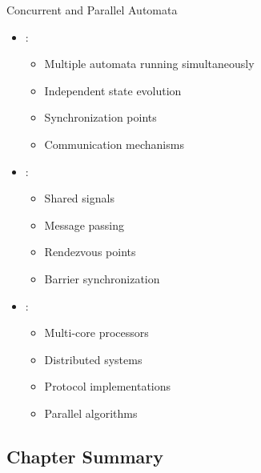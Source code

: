 \begin{frame}{Concurrent and Parallel Automata}
\begin{itemize}
\item {}:
\begin{itemize}
\item Multiple automata running simultaneously
\item Independent state evolution
\item Synchronization points
\item Communication mechanisms
\end{itemize}
\vspace{0.5cm}
\item {}:
\begin{itemize}
\item Shared signals
\item Message passing
\item Rendezvous points
\item Barrier synchronization
\end{itemize}
\vspace{0.3cm}
\item {}:
\begin{itemize}
\item Multi-core processors
\item Distributed systems
\item Protocol implementations
\item Parallel algorithms
\end{itemize}
\end{itemize}
\end{frame}

\subsection{Chapter Summary}


